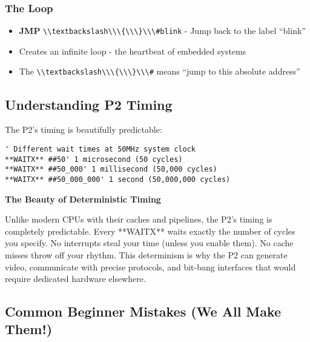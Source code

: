 \documentclass[11pt]{book}
\providecommand{\tightlist}{%
  \setlength{\itemsep}{0pt}\setlength{\parskip}{0pt}}
\providecommand{\passthrough}[1]{#1}
\begin{document}
\hypertarget{the-loop}{%
\subsubsection{The Loop}\label{the-loop}}

\begin{itemize}
\tightlist
\item
  \textbf{JMP}
  \passthrough{\lstinline!\\textbackslash\\\{\\\}\\\#blink!} - Jump back
  to the label ``blink''
\item
  Creates an infinite loop - the heartbeat of embedded systems
\item
  The \passthrough{\lstinline!\\textbackslash\\\{\\\}\\\#!} means ``jump
  to this absolute address''
\end{itemize}

\hypertarget{understanding-p2-timing}{%
\subsection{Understanding P2 Timing}\label{understanding-p2-timing}}

The P2's timing is beautifully predictable:

\begin{lstlisting}
' Different wait times at 50MHz system clock
**WAITX** ##50' 1 microsecond (50 cycles)
**WAITX** ##50_000' 1 millisecond (50,000 cycles)  
**WAITX** ##50_000_000' 1 second (50,000,000 cycles)
\end{lstlisting}

\begin{interlude}
\textbf{The Beauty of Deterministic Timing}

Unlike modern CPUs with their caches and pipelines, the P2's timing is completely predictable. Every **WAITX** waits exactly the number of cycles you specify. No interrupts steal your time (unless you enable them). No cache misses throw off your rhythm. This determinism is why the P2 can generate video, communicate with precise protocols, and bit-bang interfaces that would require dedicated hardware elsewhere.
\end{interlude}

\hypertarget{common-beginner-mistakes-we-all-make-them}{%
\subsection{Common Beginner Mistakes (We All Make
Them!)}\label{common-beginner-mistakes-we-all-make-them}}
\end{document}
